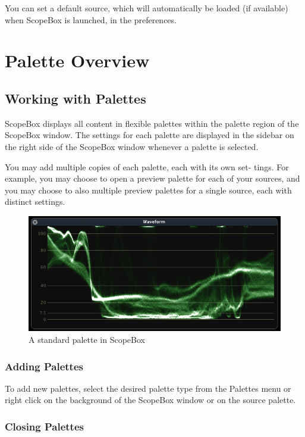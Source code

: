 \documentclass[10,letterpaper,]{report}
\begin{document}
You can set a default source, which will automatically be loaded (if
available) when ScopeBox is launched, in the preferences.

\chapter{Palette Overview}

\section{Working with Palettes}

ScopeBox displays all content in flexible palettes within the palette
region of the ScopeBox window. The settings for each palette are
displayed in the sidebar on the right side of the ScopeBox window
whenever a palette is selected.

You may add multiple copies of each palette, each with its own set-
tings. For example, you may choose to open a preview palette for each of
your sources, and you may choose to also multiple preview palettes for a
single source, each with distinct settings.

\begin{figure}[htbp]
\centering
\includegraphics{images/waveform.png}
\caption{A standard palette in ScopeBox}
\end{figure}

\subsection{Adding Palettes}

To add new palettes, select the desired palette type from the Palettes
menu or right click on the background of the ScopeBox window or on the
source palette.

\subsection{Closing Palettes}
\end{document}
